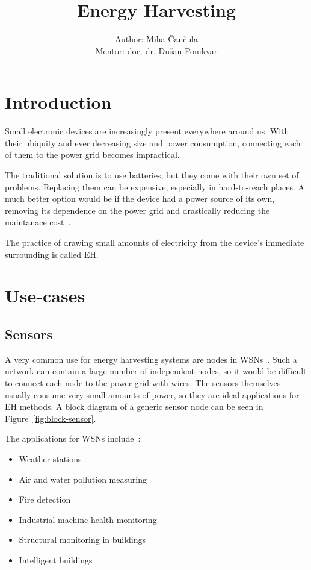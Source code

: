 \documentclass[a4paper,10pt]{article}
\title{Energy Harvesting}
\author{Author: Miha \v Can\v cula \\ Mentor: doc. dr. Du\v san Ponikvar}
\begin{document}
\maketitle

\tableofcontents

\newpage

\section{Introduction}

Small electronic devices are increasingly present everywhere around us. With their ubiquity and ever decreasing size and power consumption, connecting each of them to the power grid becomes impractical. 

The traditional solution is to use batteries, but they come with their own set of problems. Replacing them can be expensive, especially in hard-to-reach places. A much better option would be if the device had a power source of its own, removing its dependence on the power grid and drastically reducing the maintanace cost~\cite{Burgoine11}. 

The practice of drawing small amounts of electricity from the device's immediate surrounding is called \ac{EH}. 

\section{Use-cases}

\subsection{Sensors}

A very common use for energy harvesting systems are nodes in \acp{WSN}~\cite{teg-wsn-ieee,cap-wsn-ieee}. Such a network can contain a large number of independent nodes, so it would be difficult to connect each node to the power grid with wires. The sensors themselves usually consume very small amounts of power, so they are ideal applications for \acl{EH} methods. A block diagram of a generic sensor node can be seen in Figure~\ref{fig:block-sensor}. 

The applications for \acp{WSN} include~\cite{wiki:eh}:
\begin{itemize}
  \item Weather stations
  \item Air and water pollution measuring
  \item Fire detection
  \item Industrial machine health monitoring
  \item Structural monitoring in buildings
  \item Intelligent buildings~\cite{cap-wsn-ieee}
\end{itemize}
\end{document}
